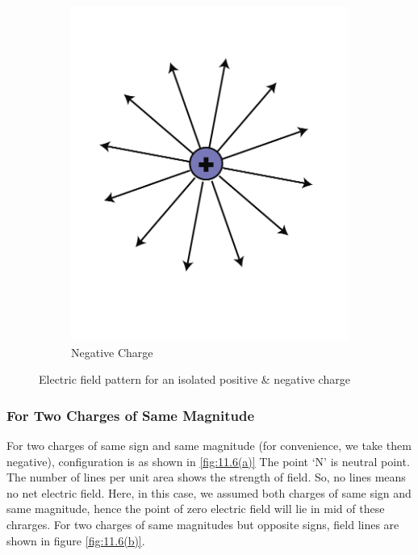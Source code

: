 \begin{figure}[htbp]
\begin{subfigure}[b]{0.3\textwidth}
      \includegraphics[width=\textwidth]{Images/11.4b}
      \caption{Negative Charge}
      \label{fig:11.5b}
  \end{subfigure}
  \caption[]{Electric field pattern for an isolated positive \& negative charge}
  \label{fig:11.5}
\end{figure}

\subsubsection{For Two Charges of Same Magnitude}
For two charges of same sign and same magnitude (for convenience,
we take them negative), configuration is as shown in \ref{fig:11.6(a)}
The point ‘N’ is neutral point. The number of lines per unit area 
shows the strength of field. So, no lines means no net electric field.
Here, in this case, we assumed both charges of same sign and same magnitude,
hence the point of zero electric field will lie in mid of these chrarges.
For two charges of same magnitudes but opposite signs,
field lines are shown in figure \ref{fig:11.6(b)}.

